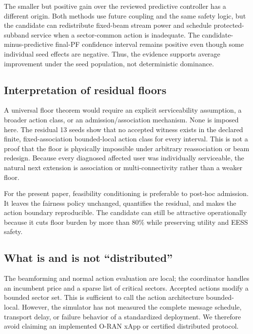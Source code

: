 \documentclass[journal]{IEEEtran}
\begin{document}
The smaller but positive gain over the reviewed predictive controller has a different origin. Both methods use future coupling and the same safety logic, but the candidate can redistribute fixed-beam stream power and schedule protected-subband service when a sector-common action is inadequate. The candidate-minus-predictive final-PF confidence interval remains positive even though some individual seed effects are negative. Thus, the evidence supports average improvement under the seed population, not deterministic dominance.

\subsection{Interpretation of residual floors}
A universal floor theorem would require an explicit serviceability assumption, a broader action class, or an admission/association mechanism. None is imposed here. The residual 13 seeds show that no accepted witness exists in the declared finite, fixed-association bounded-local action class for every interval. This is not a proof that the floor is physically impossible under arbitrary reassociation or beam redesign. Because every diagnosed affected user was individually serviceable, the natural next extension is association or multi-connectivity rather than a weaker floor.

For the present paper, feasibility conditioning is preferable to post-hoc admission. It leaves the fairness policy unchanged, quantifies the residual, and makes the action boundary reproducible. The candidate can still be attractive operationally because it cuts floor burden by more than 80\% while preserving utility and EESS safety.

\subsection{What is and is not ``distributed''}
The beamforming and normal action evaluation are local; the coordinator handles an incumbent price and a sparse list of critical sectors. Accepted actions modify a bounded sector set. This is sufficient to call the action architecture bounded-local. However, the simulator has not measured the complete message schedule, transport delay, or failure behavior of a standardized deployment. We therefore avoid claiming an implemented O-RAN xApp or certified distributed protocol.
\end{document}
